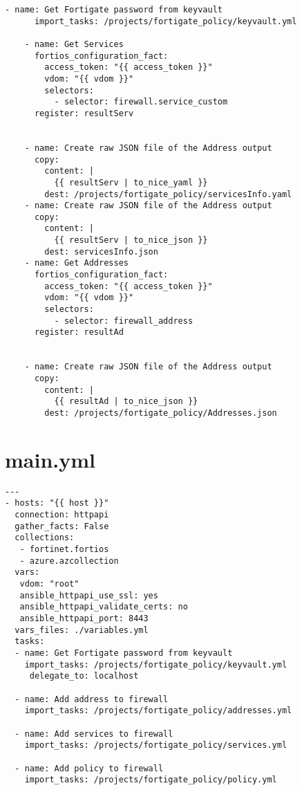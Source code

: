 \documentclass[dutch,dit,thesis]{hogentreport}
\begin{document}
\begin{lstlisting}[caption={monitoring.yml, staat in voor ophalen info uit keyvault}]
        - name: Get Fortigate password from keyvault
      import_tasks: /projects/fortigate_policy/keyvault.yml
      
    - name: Get Services
      fortios_configuration_fact:
        access_token: "{{ access_token }}"
        vdom: "{{ vdom }}"
        selectors: 
          - selector: firewall.service_custom
      register: resultServ
      

    - name: Create raw JSON file of the Address output
      copy:
        content: |
          {{ resultServ | to_nice_yaml }} 
        dest: /projects/fortigate_policy/servicesInfo.yaml
    - name: Create raw JSON file of the Address output
      copy:
        content: |
          {{ resultServ | to_nice_json }} 
        dest: servicesInfo.json
    - name: Get Addresses
      fortios_configuration_fact:
        access_token: "{{ access_token }}"
        vdom: "{{ vdom }}"
        selectors:
          - selector: firewall_address
      register: resultAd
      

    - name: Create raw JSON file of the Address output
      copy:
        content: |
          {{ resultAd | to_nice_json }} 
        dest: /projects/fortigate_policy/Addresses.json

\end{lstlisting}

\section{main.yml}
\label{code:main.yml}

\begin{lstlisting}[caption=main.yml]
    ---
- hosts: "{{ host }}"
  connection: httpapi 
  gather_facts: False                                        
  collections:
   - fortinet.fortios
   - azure.azcollection
  vars:
   vdom: "root"
   ansible_httpapi_use_ssl: yes
   ansible_httpapi_validate_certs: no
   ansible_httpapi_port: 8443
  vars_files: ./variables.yml
  tasks:
  - name: Get Fortigate password from keyvault
    import_tasks: /projects/fortigate_policy/keyvault.yml
     delegate_to: localhost
   
  - name: Add address to firewall 
    import_tasks: /projects/fortigate_policy/addresses.yml

  - name: Add services to firewall 
    import_tasks: /projects/fortigate_policy/services.yml
  
  - name: Add policy to firewall
    import_tasks: /projects/fortigate_policy/policy.yml
\end{lstlisting}
\end{document}
